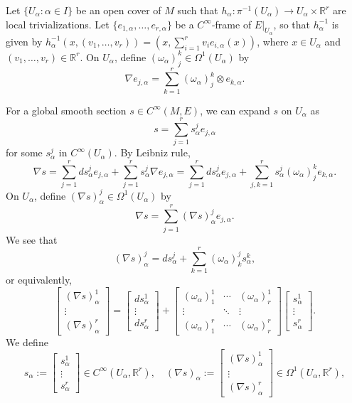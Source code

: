 \documentclass{amsart}
\numberwithin{equation}{section}
\newcommand{\bR}{\mathbb{R}}
\theoremstyle{definition}
\theoremstyle{theorem}
\begin{document}
Let $\{U_\alpha : \alpha \in I\}$ be an open cover of $M$ such that $h_\alpha : \pi^{-1}(U_\alpha) \to U_\alpha \times \mathbb{R}^r$ are local trivializations. Let $\{e_{1,\alpha}, \ldots, e_{r,\alpha}\}$ be a $C^\infty$-frame of $E|_{U_\alpha}$, so that
$h_\alpha^{-1}$ is given by $h_\alpha^{-1}(x, (v_1,\ldots, v_r)) = (x,\sum_{i=1}^r v_i e_{i,\alpha}(x))$, where
$x\in U_\alpha$ and $(v_1,\ldots, v_r)\in \bR^r$. On $U_\alpha$, define $(\omega_\alpha)_j^k\in \Omega^1(U_\alpha)$ by 
\[
\nabla e_{j,\alpha} = \sum_{k=1}^r (\omega_\alpha)_j^k \otimes e_{k,\alpha}. 
\]

For a global smooth section $s \in C^\infty(M,E)$, we can expand $s$ on $U_\alpha$ as 
\[
s = \sum_{j=1}^r s_\alpha^j e_{j,\alpha}
\]
for some $s_\alpha^j$ in $C^\infty(U_\alpha)$. By Leibniz rule,
\[
\nabla s = \sum_{j=1}^r ds_\alpha^j e_{j,\alpha} + \sum_{j=1}^r s_\alpha^j \nabla e_{j,\alpha} = \sum_{j=1}^r ds_\alpha^j e_{j,\alpha} + \sum_{j,k=1}^r s_{\alpha}^j (\omega_\alpha)_j^k e_{k,\alpha}.
\]
On $U_\alpha$, define $(\nabla s)^j_\alpha \in \Omega^1(U_\alpha)$ by 
\[
\nabla s = \sum_{j=1}^r (\nabla s)_\alpha^j e_{j,\alpha}.
\]
We see that 
\[
(\nabla s)_\alpha^j = ds_\alpha^j + \sum_{k=1}^r (\omega_\alpha)_k^j s_\alpha^k,
\]
or equivalently,
\begin{equation}\label{eqn:nabla-d}
\begin{bmatrix}
(\nabla s)_\alpha^1 \\ \vdots \\ (\nabla s)_\alpha^r
\end{bmatrix} = \begin{bmatrix}
ds_\alpha^1 \\ \vdots \\ ds_\alpha^r
\end{bmatrix} +  \begin{bmatrix}
(\omega_\alpha)_1^1 & \cdots & (\omega_\alpha)_r^1 \\
\vdots & \ddots & \vdots  \\
(\omega_\alpha)_1^r & \cdots & (\omega_\alpha)_r^r
\end{bmatrix}
\begin{bmatrix}
s_\alpha^1 \\ \vdots \\ s_\alpha^r
\end{bmatrix}.
\end{equation}
We define
\begin{equation}\label{eqn:s-nablas}
s_\alpha := \begin{bmatrix} s_\alpha^1 \\ \vdots \\ s_\alpha^r \end{bmatrix}\in C^\infty(U_\alpha,\bR^r),\quad
(\nabla s)_\alpha := \begin{bmatrix} (\nabla s)_\alpha^1 \\ \vdots \\ (\nabla s)_\alpha^r \end{bmatrix}\in \Omega^1(U_\alpha,\bR^r),
\end{equation}
\end{document}
